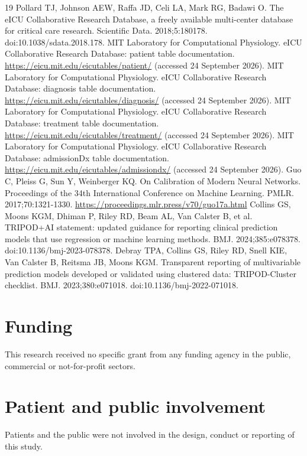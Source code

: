\documentclass[11pt]{article}
\begin{document}
\begin{thebibliography}{19}
 Pollard TJ, Johnson AEW, Raffa JD, Celi LA, Mark RG, Badawi O. The eICU Collaborative Research Database, a freely available multi-center database for critical care research. Scientific Data. 2018;5:180178. doi:10.1038/sdata.2018.178.
 MIT Laboratory for Computational Physiology. eICU Collaborative Research Database: patient table documentation. \url{https://eicu.mit.edu/eicutables/patient/} (accessed 24 September 2026).
 MIT Laboratory for Computational Physiology. eICU Collaborative Research Database: diagnosis table documentation. \url{https://eicu.mit.edu/eicutables/diagnosis/} (accessed 24 September 2026).
 MIT Laboratory for Computational Physiology. eICU Collaborative Research Database: treatment table documentation. \url{https://eicu.mit.edu/eicutables/treatment/} (accessed 24 September 2026).
 MIT Laboratory for Computational Physiology. eICU Collaborative Research Database: admissionDx table documentation. \url{https://eicu.mit.edu/eicutables/admissiondx/} (accessed 24 September 2026).
 Guo C, Pleiss G, Sun Y, Weinberger KQ. On Calibration of Modern Neural Networks. Proceedings of the 34th International Conference on Machine Learning. PMLR. 2017;70:1321-1330. \url{https://proceedings.mlr.press/v70/guo17a.html}
 Collins GS, Moons KGM, Dhiman P, Riley RD, Beam AL, Van Calster B, et al. TRIPOD+AI statement: updated guidance for reporting clinical prediction models that use regression or machine learning methods. BMJ. 2024;385:e078378. doi:10.1136/bmj-2023-078378.
 Debray TPA, Collins GS, Riley RD, Snell KIE, Van Calster B, Reitsma JB, Moons KGM. Transparent reporting of multivariable prediction models developed or validated using clustered data: TRIPOD-Cluster checklist. BMJ. 2023;380:e071018. doi:10.1136/bmj-2022-071018.
\end{thebibliography}

\section*{Funding}
This research received no specific grant from any funding agency in the public, commercial or not-for-profit sectors.

\section*{Patient and public involvement}
Patients and the public were not involved in the design, conduct or reporting of this study.
\end{document}
